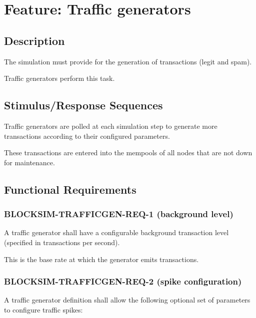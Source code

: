 \documentclass{scrreprt}
\begin{document}
\section{Feature: Traffic generators}

\subsection{Description}

The simulation must provide for the generation of transactions (legit and spam).

Traffic generators perform this task.


\subsection{Stimulus/Response Sequences}

Traffic generators are polled at each simulation step to generate more
transactions according to their configured parameters.

These transactions are entered into the mempools of all nodes that are not
down for maintenance.


\subsection{Functional Requirements}

\subsubsection{BLOCKSIM-TRAFFICGEN-REQ-1 (background level)}

A traffic generator shall have a configurable background transaction level
(specified in transactions per second).

This is the base rate at which the generator emits transactions.

\subsubsection{BLOCKSIM-TRAFFICGEN-REQ-2 (spike configuration)}

A traffic generator definition shall allow the following optional set of parameters to configure
traffic spikes:
\end{document}
